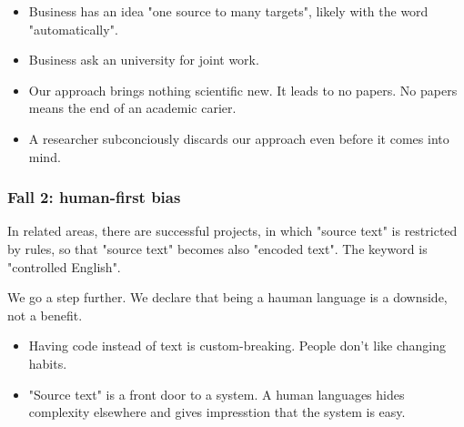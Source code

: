 \documentclass{article}
\begin{document}
\begin{itemize}
\item Business has an idea "one source to many targets", likely with the word "automatically".
\item Business ask an university for joint work.
\item Our approach brings nothing scientific new. It leads to no papers. No papers means the end of an academic carier.
\item A researcher subconciously discards our approach even before it comes into mind.
\end{itemize}

\subsubsection{Fall 2: human-first bias}

In related areas, there are successful projects, in which "source text" is restricted by rules, so that "source text" becomes also "encoded text". The keyword is "controlled English".

We go a step further. We declare that being a hauman language is a downside, not a benefit.

\begin{itemize}
\item Having code instead of text is custom-breaking. People don't like changing habits.
\item "Source text" is a front door to a system. A human languages hides complexity elsewhere and gives impresstion that the system is easy.
\end{itemize}
\end{document}
